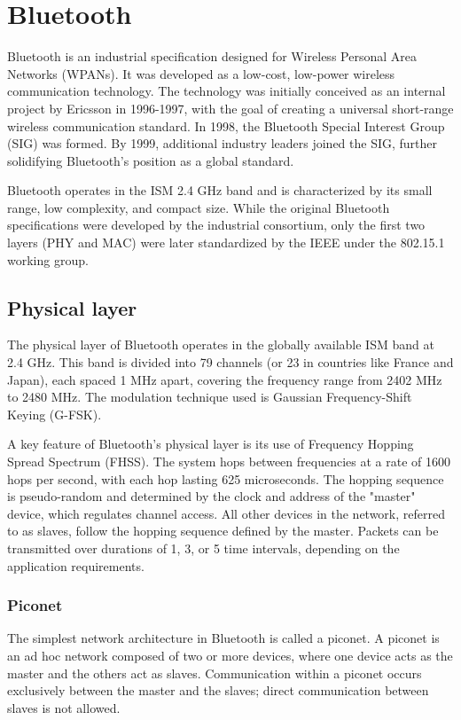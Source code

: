 \section{Bluetooth}

Bluetooth is an industrial specification designed for Wireless Personal Area Networks (WPANs). 
It was developed as a low-cost, low-power wireless communication technology. 
The technology was initially conceived as an internal project by Ericsson in 1996-1997, with the goal of creating a universal short-range wireless communication standard.
In 1998, the Bluetooth Special Interest Group (SIG) was formed. 
By 1999, additional industry leaders joined the SIG, further solidifying Bluetooth's position as a global standard.

Bluetooth operates in the ISM 2.4 GHz band and is characterized by its small range, low complexity, and compact size. 
While the original Bluetooth specifications were developed by the industrial consortium, only the first two layers  (PHY and MAC) were later standardized by the IEEE under the 802.15.1 working group.

\subsection{Physical layer}
The physical layer of Bluetooth operates in the globally available ISM band at 2.4 GHz. 
This band is divided into 79 channels (or 23 in countries like France and Japan), each spaced 1 MHz apart, covering the frequency range from 2402 MHz to 2480 MHz. 
The modulation technique used is Gaussian Frequency-Shift Keying (G-FSK).

A key feature of Bluetooth's physical layer is its use of Frequency Hopping Spread Spectrum (FHSS). 
The system hops between frequencies at a rate of 1600 hops per second, with each hop lasting 625 microseconds. 
The hopping sequence is pseudo-random and determined by the clock and address of the "master" device, which regulates channel access.
All other devices in the network, referred to as slaves, follow the hopping sequence defined by the master. 
Packets can be transmitted over durations of 1, 3, or 5 time intervals, depending on the application requirements.

\subsubsection{Piconet}
The simplest network architecture in Bluetooth is called a piconet. 
A piconet is an ad hoc network composed of two or more devices, where one device acts as the master and the others act as slaves. 
Communication within a piconet occurs exclusively between the master and the slaves; direct communication between slaves is not allowed.

